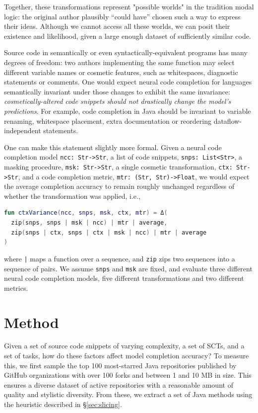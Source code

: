 \documentclass[sigconf,review,anonymous]{acmart}
\begin{document}
  Together, these transformations represent "possible worlds" in the tradition modal logic: the original author plausibly ``could have'' chosen such a way to express their ideas. Although we cannot access all these worlds, we can posit their existence and likelihood, given a large enough dataset of sufficiently similar code.

  Source code in semantically or even syntactically-equivalent programs has many degrees of freedom: two authors implementing the same function may select different variable names or cosmetic features, such as whitespaces, diagnostic statements or comments. One would expect neural code completion for languages semantically invariant under those changes to exhibit the same invariance: \textit{cosmetically-altered code snippets should not drastically change the model's predictions}. For example, code completion in Java should be invariant to variable renaming, whitespace placement, extra documentation or reordering dataflow-independent statements.

  One can make this statement slightly more formal. Given a neural code completion model \lstinline|ncc: Str->Str|, a list of code snippets, \lstinline|snps: List<Str>|, a masking procedure, \lstinline|msk: Str->Str|, a single cosmetic transformation, \lstinline|ctx: Str->Str|, and a code completion metric, \lstinline|mtr: (Str, Str)->Float|, we would expect the average completion accuracy to remain roughly unchanged regardless of whether the transformation was applied, i.e.,

  \noindent\begin{lstlisting}[basicstyle=\footnotesize\ttfamily, language=kotlin,label={lst:lstlisting}]
fun ctxVariance(ncc, snps, msk, ctx, mtr) = Δ(
  zip(snps, snps | msk | ncc) | mtr | average,
  zip(snps | ctx, snps | ctx | msk | ncc) | mtr | average
)
  \end{lstlisting}

  \noindent where \texttt{|} maps a function over a sequence, and \lstinline|zip| zips two sequences into a sequence of pairs. We assume \lstinline|snps| and \lstinline|msk| are fixed, and evaluate three different neural code completion models, five different transformations and two different metrics.


  \pagebreak\section{Method}

  Given a set of source code snippets of varying complexity, a set of SCTs, and a set of tasks, how do these factors affect model completion accuracy? To measure this, we first sample the top 100 most-starred Java repositories published by GitHub organizations with over 100 forks and between 1 and 10 MB in size. This ensures a diverse dataset of active repositories with a reasonable amount of quality and stylistic diversity. From these, we extract a set of Java methods using the heuristic described in \S\ref{sec:slicing}.
\end{document}
